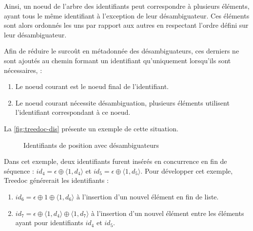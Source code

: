 Ainsi, un noeud de l'arbre des identifiants peut correspondre à plusieurs éléments, ayant tous le même identifiant à l'exception de leur désambiguateur.
Ces éléments sont alors ordonnés les uns par rapport aux autres en respectant l'ordre défini sur leur désambiguateur.

Afin de réduire le surcoût en métadonnée des désambiguateurs, ces derniers ne sont ajoutés au chemin formant un identifiant qu'uniquement lorsqu'ils sont nécessaires, \ie :
\begin{enumerate}
  \item Le noeud courant est le noeud final de l'identifiant.
  \item Le noeud courant nécessite désambiguation, \ie plusieurs éléments utilisent l'identifiant correspondant à ce noeud.
\end{enumerate}
La \autoref{fig:treedoc-dis} présente un exemple de cette situation.
\begin{figure}[!ht]

  \centering
  \caption{Identifiants de position avec désambiguateurs}
  \label{fig:treedoc-dis}
\end{figure}
Dans cet exemple, deux identifiants furent insérés en concurrence en fin de séquence : $id_4 = \epsilon \oplus \langle 1,d_4 \rangle$ et $id_5 = \epsilon \oplus \langle 1,d_5 \rangle$.
Pour développer cet exemple, Treedoc générerait les identifiants :
\begin{enumerate}
  \item $id_6 = \epsilon \oplus 1 \oplus \langle 1,d_6 \rangle$ à l'insertion d'un nouvel élément en fin de liste.
  \item $id_7 = \epsilon \oplus \langle 1,d_4 \rangle \oplus \langle 1,d_7 \rangle$ à l'insertion d'un nouvel élément entre les éléments ayant pour identifiants $id_4$ et $id_5$.
\end{enumerate}

